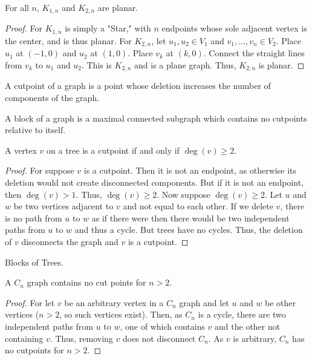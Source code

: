 \documentclass[crop=false,class=book]{standalone}
\begin{document}
\begin{theorem}
For all $n$, $K_{1,n}$ and $K_{2,n}$ are planar.
\end{theorem}
\begin{proof}
For $K_{1,n}$ is simply a "Star," with $n$ endpoints whose sole adjacent vertex is the center, and is thus planar. For $K_{2,n}$, let $u_1,u_2 \in V_1$ and $v_1,\hdots, v_n \in V_2$. Place $u_1$ at $(-1,0)$ and $u_2$ at $(1,0)$. Place $v_k$ at $(k,0)$. Connect the straight lines from $v_k$ to $u_1$ and $u_2$. This is $K_{2,n}$ and is a plane graph. Thus, $K_{2,n}$ is planar.
\end{proof}
\begin{definition}
A cutpoint of a graph is a point whose deletion increases the number of components of the graph.
\end{definition}
\begin{definition}
A block of a graph is a maximal connected subgraph which contains no cutpoints relative to itself.
\end{definition}
\begin{theorem}
A vertex $v$ on a tree is a cutpoint if and only if $\deg(v) \geq 2$.
\end{theorem}
\begin{proof}
For suppose $v$ is a cutpoint. Then it is not an endpoint, as otherwise its deletion would not create disconnected components. But if it is not an endpoint, then $\deg(v)>1$. Thus, $\deg(v)\geq 2$. Now suppose $\deg(v) \geq 2$. Let $u$ and $w$ be two vertices adjacent to $v$ and not equal to each other. If we delete $v$, there is no path from $u$ to $w$ as if there were then there would be two independent paths from $u$ to $w$ and thus a cycle. But trees have no cycles. Thus, the deletion of $v$ disconnects the graph and $v$ is a cutpoint.
\end{proof}
\begin{theorem}
Blocks of Trees.
\end{theorem}
\begin{corollary}
A $C_n$ graph contains no cut points for $n>2$.
\end{corollary}
\begin{proof}
For let $v$ be an arbitrary vertex in a $C_n$ graph and let $u$ and $w$ be other vertices ($n>2$, so such vertices exist). Then, as $C_n$ is a cycle, there are two independent paths from $u$ to $w$, one of which contains $v$ and the other not containing $v$. Thus, removing $v$ does not disconnect $C_n$. As $v$ is arbitrary, $C_n$ has no cutpoints for $n>2$.
\end{proof}
\end{document}
